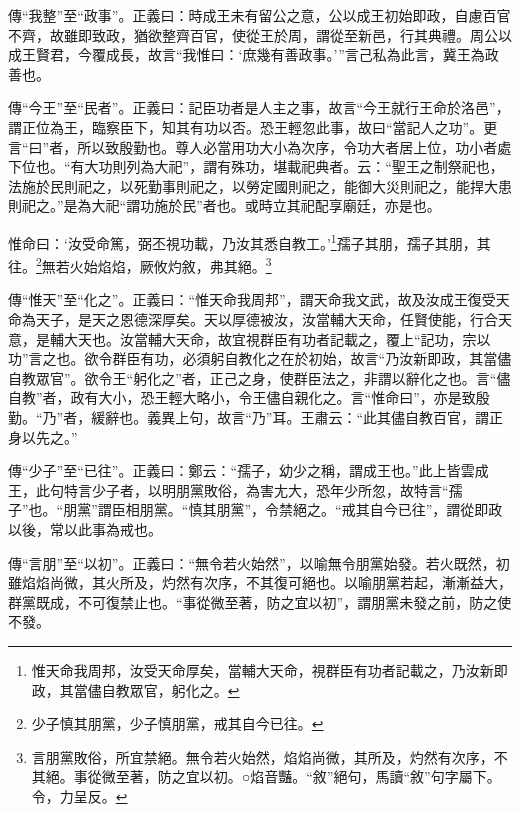 {\noindent\zhuan{}\fzbyks 傳“我整”至“政事”。正義曰：時成王未有留公之意，公以成王初始即政，自慮百官不齊，故雖即致政，猶欲整齊百官，使從王於周，謂從至新邑，行其典禮。周公以成王賢君，今覆成長，故言“我惟曰：‘庶幾有善政事。’”言己私為此言，冀王為政善也。 \par}

{\noindent\zhuan{}\fzbyks 傳“今王”至“民者”。正義曰：記臣功者是人主之事，故言“今王就行王命於洛邑”，謂正位為王，臨察臣下，知其有功以否。恐王輕忽此事，故曰“當記人之功”。更言“曰”者，所以致殷勤也。尊人必當用功大小為次序，令功大者居上位，功小者處下位也。“有大功則列為大祀”，謂有殊功，堪載祀典者。云：“聖王之制祭祀也，法施於民則祀之，以死勤事則祀之，以勞定國則祀之，能御大災則祀之，能捍大患則祀之。”是為大祀“謂功施於民”者也。或時立其祀配享廟廷，亦是也。 \par}

惟命曰：‘汝受命篤，弼丕視功載，乃汝其悉自教工。’\footnote{惟天命我周邦，汝受天命厚矣，當輔大天命，視群臣有功者記載之，乃汝新即政，其當儘自教眾官，躬化之。}孺子其朋，孺子其朋，其往。\footnote{少子慎其朋黨，少子慎朋黨，戒其自今已往。}無若火始焰焰，厥攸灼敘，弗其絕。\footnote{言朋黨敗俗，所宜禁絕。無令若火始然，焰焰尚微，其所及，灼然有次序，不其絕。事從微至著，防之宜以初。○焰音豔。“敘”絕句，馬讀“敘”句字屬下。令，力呈反。}


{\noindent\zhuan{}\fzbyks 傳“惟天”至“化之”。正義曰：“惟天命我周邦”，謂天命我文武，故及汝成王復受天命為天子，是天之恩德深厚矣。天以厚德被汝，汝當輔大天命，任賢使能，行合天意，是輔大天也。汝當輔大天命，故宜視群臣有功者記載之，覆上“記功，宗以功”言之也。欲令群臣有功，必須躬自教化之在於初始，故言“乃汝新即政，其當儘自教眾官”。欲令王“躬化之”者，正己之身，使群臣法之，非謂以辭化之也。言“儘自教”者，政有大小，恐王輕大略小，令王儘自親化之。言“惟命曰”，亦是致殷勤。“乃”者，緩辭也。義異上句，故言“乃”耳。王肅云：“此其儘自教百官，謂正身以先之。” \par}

{\noindent\zhuan{}\fzbyks 傳“少子”至“已往”。正義曰：鄭云：“孺子，幼少之稱，謂成王也。”此上皆雲成王，此句特言少子者，以明朋黨敗俗，為害尢大，恐年少所忽，故特言“孺子”也。“朋黨”謂臣相朋黨。“慎其朋黨”，令禁絕之。“戒其自今已往”，謂從即政以後，常以此事為戒也。 \par}

{\noindent\zhuan{}\fzbyks 傳“言朋”至“以初”。正義曰：“無令若火始然”，以喻無令朋黨始發。若火既然，初雖焰焰尚微，其火所及，灼然有次序，不其復可絕也。以喻朋黨若起，漸漸益大，群黨既成，不可復禁止也。“事從微至著，防之宜以初”，謂朋黨未發之前，防之使不發。 \par}

